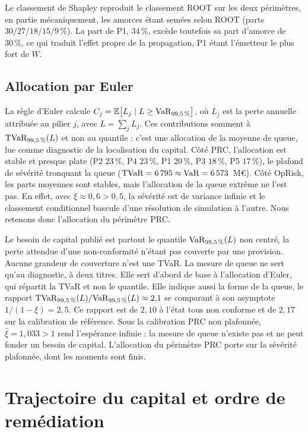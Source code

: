 Le classement de Shapley reproduit le classement ROOT sur les deux périmètres, en partie
mécaniquement, les amorces étant semées selon ROOT (parts $30/27/18/15/9\,\%$). La part de P1,
$34\,\%$, excède toutefois sa part d'amorce de $30\,\%$, ce qui traduit l'effet propre de la
propagation, P1 étant l'émetteur le plus fort de $W$.

\subsection{Allocation par Euler}

La règle d'Euler \citep{tasche1999} calcule
$C_j = \mathbb{E}\bigl[L_j \mid L \ge \mathrm{VaR}_{99{,}5\,\%}\bigr]$, où $L_j$ est la perte annuelle attribuée au pilier $j$, avec $L=\sum_j L_j$. Ces contributions somment à $\mathrm{TVaR}_{99{,}5\,\%}(L)$ et non au quantile : c'est une allocation de
la moyenne de queue, lue comme diagnostic de la localisation du capital. Côté PRC, l'allocation est stable et presque plate (P2 $23\,\%$, P4 $23\,\%$, P1 $20\,\%$, P3
$18\,\%$, P5 $17\,\%$), le plafond de sévérité tronquant la queue ($\mathrm{TVaR} = 6\,795 \approx \mathrm{VaR} =
6\,573$~M\euro). Côté OpRisk, les parts moyennes sont stables, mais l'allocation de la queue
extrême ne l'est pas. En effet, avec $\xi \approx 0{,}6 > 0{,}5$, la sévérité est de variance infinie
et le classement conditionnel bascule d'une résolution de simulation à l'autre. Nous retenons donc
l'allocation du périmètre PRC.

Le besoin de capital publié est partout le quantile $\mathrm{VaR}_{99{,}5\,\%}(L)$ non centré, la perte
attendue d'une non-conformité n'étant pas couverte par une provision. Aucune grandeur de couverture
n'est une TVaR. La mesure de queue ne sert qu'au diagnostic, à deux titres. Elle sert d'abord de
base à l'allocation d'Euler, qui répartit la TVaR et non le quantile. Elle indique aussi la forme de la queue, le rapport
$\mathrm{TVaR}_{99{,}5\,\%}(L)/\mathrm{VaR}_{99{,}5\,\%}(L) \approx 2{,}1$ se comparant à son asymptote
$1/(1-\xi) = 2{,}5$. Ce rapport est de $2{,}10$ à l'état tous non conforme et de $2{,}17$ sur la
calibration de référence. Sous la calibration PRC non plafonnée, $\hat\xi=1{,}033>1$ rend l'espérance infinie :
la mesure de queue n'existe pas et ne peut fonder un besoin de capital. L'allocation du
périmètre PRC porte sur la sévérité plafonnée, dont les moments sont finis.

\section{Trajectoire du capital et ordre de remédiation}
\label{sec:res-traj}

